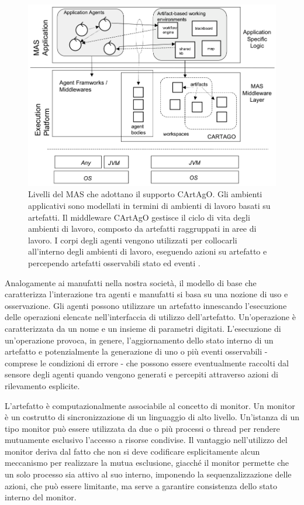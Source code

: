 \begin{figure}[H]
\centering
\includegraphics[width=\textwidth]{figures/CArtAgO_architettura.png}
\caption{Livelli del MAS che adottano il supporto CArtAgO. Gli ambienti applicativi sono modellati in termini di ambienti di lavoro basati su artefatti. Il middleware CArtAgO gestisce il ciclo di vita degli ambienti di lavoro, composto da artefatti raggruppati in aree di lavoro. I corpi degli agenti vengono utilizzati per collocarli all'interno degli ambienti di lavoro, eseguendo azioni su artefatto e percependo artefatti osservabili stato ed eventi \cite{cartago}.}
\label{architettura_CArtAgO}
\end{figure}

Analogamente ai manufatti nella nostra società, il modello di base che caratterizza l'interazione tra agenti e manufatti si basa su una nozione di uso e osservazione. Gli agenti possono utilizzare un artefatto innescando l'esecuzione delle operazioni elencate nell'interfaccia di utilizzo dell'artefatto. Un'operazione è caratterizzata da un nome e un insieme di parametri digitati. L'esecuzione di un'operazione provoca, in genere, l'aggiornamento dello stato interno di un artefatto e potenzialmente la generazione di uno o più eventi osservabili - comprese le condizioni di errore - che possono essere eventualmente raccolti dal sensore degli agenti quando vengono generati e percepiti attraverso azioni di rilevamento esplicite.

\medskip

L'artefatto è computazionalmente associabile al concetto di monitor. Un monitor è un costrutto di sincronizzazione di un linguaggio di alto livello. Un'istanza di un tipo monitor può essere utilizzata da due o più processi o thread per rendere mutuamente esclusivo l'accesso a risorse condivise. Il vantaggio nell'utilizzo del monitor deriva dal fatto che non si deve codificare esplicitamente alcun meccanismo per realizzare la mutua esclusione, giacché il monitor permette che un solo processo sia attivo al suo interno, imponendo la sequenzalizzazione delle azioni, che può essere limitante, ma serve a garantire consistenza dello stato interno del monitor.

